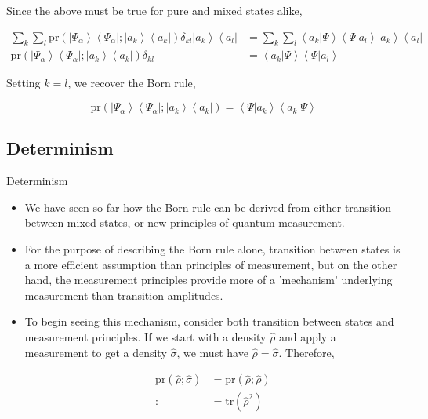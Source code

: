 \documentclass[9pt,handout]{beamer}
\newcommand{\pr}[0]{\text{pr}}
\newcommand{\tr}[0]{\text{tr}}
\begin{document}
\begin{frame}{}
Since the above must be true for pure and mixed states alike,

\begin{align*}
\sum_k \sum_l \pr \left( \left\lvert \Psi_\alpha \right\rangle \left\langle \Psi_\alpha \right\rvert; \left\lvert a_k \right\rangle \left\langle a_k \right\rvert \right) \delta_{k l} \left\lvert a_k \right\rangle \left\langle a_l \right\rvert & = \sum_k \sum_l \left\langle a_k \right\rvert \left. \Psi \right\rangle \left\langle \Psi \right\rvert \left. a_l \right\rangle \left\lvert a_k \right\rangle \left\langle a_l \right\rvert \\
\pr \left( \left\lvert \Psi_\alpha \right\rangle \left\langle \Psi_\alpha \right\rvert; \left\lvert a_k \right\rangle \left\langle a_k \right\rvert \right) \delta_{k l} & = \left\langle a_k \right\rvert \left. \Psi \right\rangle \left\langle \Psi \right\rvert \left. a_l \right\rangle
\end{align*}

Setting $k = l$, we recover the Born rule,

$$\pr \left( \left\lvert \Psi_\alpha \right\rangle \left\langle \Psi_\alpha \right\rvert; \left\lvert a_k \right\rangle \left\langle a_k \right\rvert \right) = \left\langle \Psi \right\rvert \left. a_k \right\rangle \left\langle a_k \right\rvert \left. \Psi \right\rangle$$
\end{frame}

\subsection{Determinism}
\begin{frame}{Determinism}
\begin{itemize}
\item We have seen so far how the Born rule can be derived from either transition between mixed states, or new principles of quantum measurement.

\item For the purpose of describing the Born rule alone, transition between states is a more efficient assumption than principles of measurement, but on the other hand, the measurement principles provide more of a 'mechanism' underlying measurement than transition amplitudes.

\item To begin seeing this mechanism, consider both transition between states and measurement principles. If we start with a density $\widehat{\rho}$ and apply a measurement to get a density $\widehat{\sigma}$, we must have $\widehat{\rho} = \widehat{\sigma}$. Therefore,

\begin{align*}
\pr \left( \widehat{\rho}; \widehat{\sigma} \right) & = \pr \left( \widehat{\rho}; \widehat{\rho} \right) \\
: & = \tr \left( \widehat{\rho}^2 \right) 
\end{align*}
\end{itemize}
\end{frame}
\end{document}
